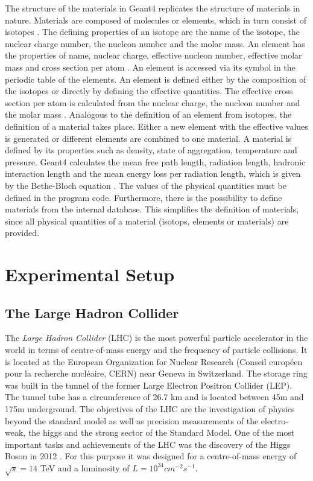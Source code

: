 \documentclass[12pt, a4paper]{thesis}
\begin{document}
The structure of the materials in Geant4 replicates the structure of
materials in nature. Materials are composed of molecules or elements,
which in turn consist of isotopes \cite{geant_simul_toolkit}. The
defining properties of an isotope are the name of the isotope, the
nuclear charge number, the nucleon number and the molar mass. An
element has the properties of name, nuclear charge, effective nucleon
number, effective molar mass and cross section per atom
\cite{geant4-doc}. An element is accessed via its symbol in the
periodic table of the elements.  An element is defined either by the
composition of the isotopes or directly by defining the effective
quantities. The effective cross section per atom is calculated from
the nuclear charge, the nucleon number and the molar mass
\cite{geant4-doc}. Analogous to the definition of an element from
isotopes, the definition of a material takes place.  Either a new
element with the effective values is generated or different elements
are combined to one material. A material is defined by its properties
such as density, state of aggregation, temperature and
pressure. Geant4 calculates the mean free path length, radiation
length, hadronic interaction length and the mean energy loss per
radiation length, which is given by the Bethe-Bloch equation
\cite{geant4-doc}. The values of the physical quantities must be
defined in the program code. Furthermore, there is the possibility to
define materials from the internal database. This simplifies the
definition of materials, since all physical quantities of a material
(isotops, elements or materials) are provided.

\chapter{Experimental Setup}
\label{sec:org5cd8e52}
\section{The Large Hadron Collider}
\label{sec:orgf5b86e0}

The \emph{Large Hadron Collider} (LHC) \cite{lhc_machine} is the most
powerful particle accelerator in the world in terms of centre-of-mass
energy and the frequency of particle collisions. It is located at the
European Organization for Nuclear Research (Conseil européen pour la
recherche nucléaire, CERN) near Geneva in Switzerland. The storage
ring was built in the tunnel of the former Large Electron Positron
Collider (LEP). The tunnel tube has a circumference of 26.7 km and is
located between 45m and 175m underground. The objectives of the LHC
are the investigation of physics beyond the standard model as well as
precision measurements of the electro-weak, the higgs and the strong
sector of the Standard Model. One of the most important tasks and
achievements of the LHC was the discovery of the Higgs Boson in 2012
\cite{higgs_cms,higgs_atlas}. For this purpose it was designed for a
centre-of-mass energy of \(\sqrt{s} = 14\) TeV and a luminosity of \(L
= 10^{34} cm^{-2}s^{-1}\).
\end{document}
